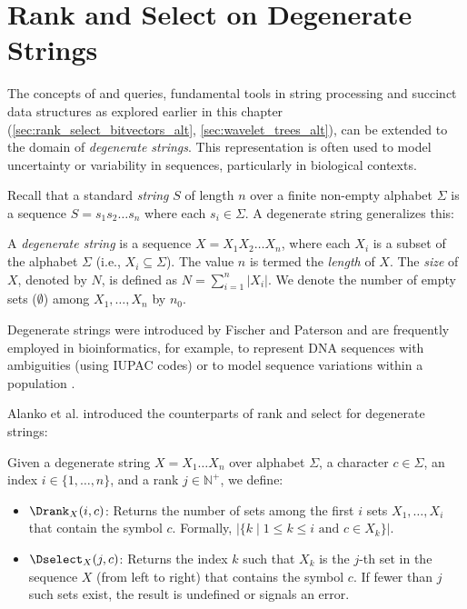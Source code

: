 \section{Rank and Select on Degenerate Strings}
\label{sec:degenerate_strings} %

The concepts of \Rank{} and \Select{} queries, fundamental tools in string processing and succinct data structures as explored earlier in this chapter (\autoref{sec:rank_select_bitvectors_alt}, \autoref{sec:wavelet_trees_alt}), can be extended to the domain of \emph{degenerate strings}. This representation is often used to model uncertainty or variability in sequences, particularly in biological contexts.

Recall that a standard \emph{string} $S$ of length $n$ over a finite non-empty alphabet $\Sigma$ is a sequence $S = s_1 s_2 \dots s_n$ where each $s_i \in \Sigma$. A degenerate string generalizes this:

\begin{definition} \label{def:degenerate_string}
    A \emph{degenerate string} is a sequence $X = X_1 X_2 \dots X_n$, where each $X_i$ is a subset of the alphabet $\Sigma$ (i.e., $X_i \subseteq \Sigma$). The value $n$ is termed the \emph{length} of $X$. The \emph{size} of $X$, denoted by $N$, is defined as $N = \sum_{i=1}^{n} |X_i|$. We denote the number of empty sets ($\emptyset$) among $X_1, \dots, X_n$ by $n_0$.
\end{definition}

Degenerate strings were introduced by Fischer and Paterson \cite{fischer1974string} and are frequently employed in bioinformatics, for example, to represent DNA sequences with ambiguities (using IUPAC codes) or to model sequence variations within a population \cite{SubsetWT, alzamel2018degenerate}.

Alanko et al. \cite{SubsetWT} introduced the counterparts of rank and select for degenerate strings:

\begin{definition} \label{def:subset_rank_select}
    Given a degenerate string $X = X_1 \dots X_n$ over alphabet $\Sigma$, a character $c \in \Sigma$, an index $i \in \{1, \dots, n\}$, and a rank $j \in \mathbb{N}^+$, we define:
    \begin{itemize}
        \item $\Drank_X(i, c)$: Returns the number of sets among the first $i$ sets $X_1, \dots, X_i$ that contain the symbol $c$. Formally, $|\{k \mid 1 \le k \le i \text{ and } c \in X_k\}|$.
        \item $\Dselect_X(j, c)$: Returns the index $k$ such that $X_k$ is the $j$-th set in the sequence $X$ (from left to right) that contains the symbol $c$. If fewer than $j$ such sets exist, the result is undefined or signals an error.
    \end{itemize}
\end{definition}

